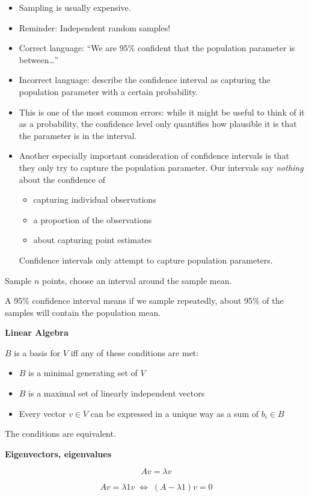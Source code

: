 \begin{enumerate}
\begin{itemize}
  \item Sampling is usually expensive.
  \item Reminder:  Independent random samples!
  \item
    Correct language: ``We are 95\% confident that the population
    parameter is between\dots''
  \item
    Incorrect language: describe the confidence interval as capturing
    the population parameter with a certain probability.
  \item
    This is one of the most common errors: while it might be useful to
    think of it as a probability, the confidence level only quantifies
    how plausible it is that the parameter is in the interval.
  \item
    Another especially important consideration of confidence intervals
    is that they only try to capture the population parameter. Our
    intervals say \textit{nothing} about the confidence of
    \begin{itemize}
    \item capturing individual observations
    \item a proportion of the observations
    \item about capturing point estimates
    \end{itemize}
    Confidence intervals only attempt to capture population
    parameters.
  \end{itemize}
\end{enumerate}

Sample $n$ points, choose an interval around the sample mean.

A 95\% confidence interval means if we sample repeatedly, about 95\%
of the samples will contain the population mean.


\textbf{Linear Algebra}

$B$ is a basis for $V$ iff any of these conditions are met:
\begin{itemize}
\item $B$ is a minimal generating set of $V$
\item $B$ is a maximal set of linearly independent vectors
\item Every vector $v\in V$ can be expressed in a unique way as a sum of $b_i\in B$
\end{itemize}
The conditions are equivalent.

\textbf{Eigenvectors, eigenvalues}

\begin{displaymath}
  Av = \lambda v
\end{displaymath}

\begin{displaymath}
  Av = \lambda 1 v \;\iff\; (A-\lambda 1)v = 0
\end{displaymath}



